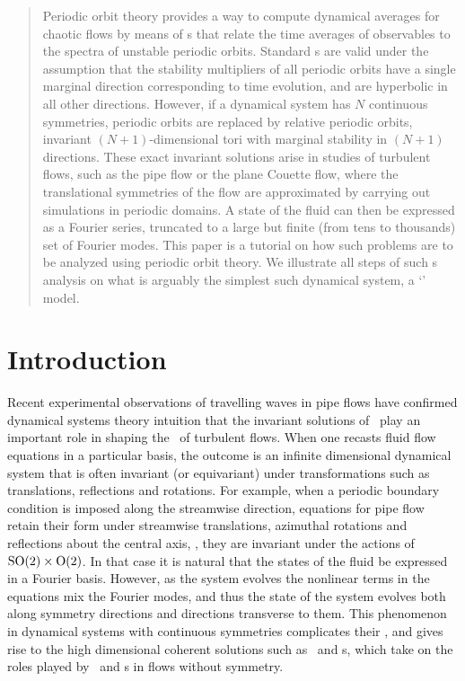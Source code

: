 \documentclass[aip,cha,
reprint,
secnumarabic,
nofootinbib, tightenlines,
nobibnotes, showkeys, showpacs,
groupedaddress,
]{revtex4-1}
\begin{document}
\begin{quotation}
Periodic orbit theory provides a way to compute dynamical averages for
chaotic flows by means of {\cycForm s} that relate the time averages of
observables to the spectra of unstable periodic orbits. Standard
{\cycForm s} are valid under the assumption that the stability
multipliers of all periodic orbits have a single marginal direction
corresponding to time evolution, and are hyperbolic in all other
directions. However, if a dynamical system has $N$ continuous symmetries,
periodic orbits are replaced by relative periodic orbits, invariant
$(N+1)$-dimensional tori with marginal stability in $(N+1)$ directions.
These exact invariant solutions arise in studies of turbulent flows, such
as the pipe flow or the plane Couette flow, where the translational
symmetries of the flow are approximated by carrying out simulations in
periodic domains. A state of the fluid can then be expressed as a Fourier
series, truncated to a large but finite (from tens to thousands) set of
Fourier modes. This paper is a tutorial on how such problems are to be
analyzed using periodic orbit theory. We illustrate all steps of such
\rpo s analysis on what is arguably the simplest such dynamical system, a
`\twomode' model.
\end{quotation}

\section{Introduction}
\label{s:intro}

Recent experimental observations of travelling waves in pipe flows have
confirmed dynamical systems theory intuition that the invariant solutions
of \NSe\ play an important role in shaping the \statesp\ of turbulent
flows. When one recasts fluid flow equations in a
particular basis, the outcome is an infinite dimensional dynamical system
that is often invariant (or equivariant) under transformations such as
translations, reflections and rotations. For example, when a periodic
boundary condition is imposed along the streamwise direction, equations
for pipe flow retain their form under streamwise translations, azimuthal
rotations and reflections about the central axis, \ie, they are invariant
under the actions of $\textrm{SO}(2) \times \textrm{O}(2)$. In that case it is natural
that the states of the fluid be expressed in a Fourier basis. However,
as the system evolves the nonlinear terms in the equations mix the
Fourier modes, and thus the state of the system evolves both along
symmetry directions and directions transverse to them.
This phenomenon in dynamical systems with continuous symmetries
complicates their \statesp, and gives rise to the high dimensional coherent
solutions such as \reqva\ and \rpo s, which take on the roles played by
\eqva\ and \po s in flows without symmetry.
\end{document}
